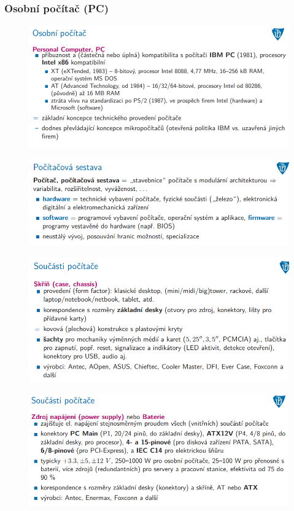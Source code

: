 \documentclass[10pt,a4paper]{article}
\begin{document}
\subsubsection{Osobní počítač (PC)}
\begin{figure} [h]
	\includegraphics[scale=0.65]{img/prvni_odstavec/otazka4/osobni_pocitac.png}	
\end{figure}

\begin{figure} [h]
	\includegraphics[scale=0.65]{img/prvni_odstavec/otazka4/pocitacova_sestava.png}	
\end{figure}

\begin{figure} [h]
	\includegraphics[scale=0.65]{img/prvni_odstavec/otazka4/soucasti_pocitace1.png}	
\end{figure}

\begin{figure} [h]
	\includegraphics[scale=0.65]{img/prvni_odstavec/otazka4/soucasti_pocitace2.png}	
\end{figure}
\end{document}

